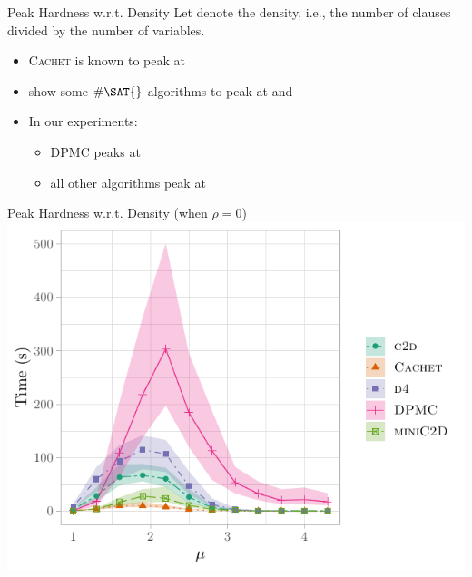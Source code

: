 \documentclass{beamer}
\begin{document}
\begin{frame}{Peak Hardness w.r.t. Density}
  Let \structure{$\mu$} denote the \alert{density}, i.e., the number of clauses
  divided by the number of variables.
  \begin{itemize}
    \item \textsc{Cachet} is known to peak at 
          \textcolor{gray}{\parencite{DBLP:conf/sat/SangBBKP04}}
    \item \textcolor{gray}{\textcite{DBLP:conf/aaai/Pehoushek00}} show some
          $\#\SAT{}$ algorithms to peak at  and
          \pause
    \item In our experiments:
    \begin{itemize}
      \item \textsc{DPMC} peaks at 
      \item all other algorithms peak at 
    \end{itemize}
  \end{itemize}
\end{frame}

\begin{frame}{Peak Hardness w.r.t. Density (when $\rho = 0$)}
  \centering
  \includegraphics{treewidth.pdf}
\end{frame}
\end{document}
